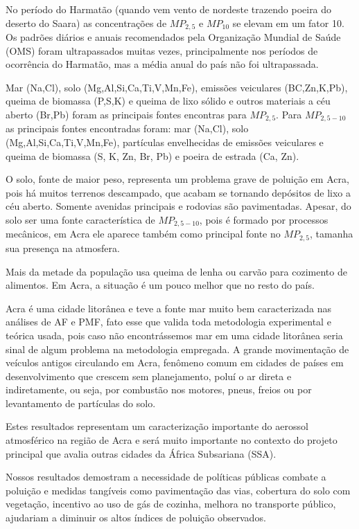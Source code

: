 No período do Harmatão (quando vem vento de nordeste trazendo poeira do deserto do Saara) as concentrações de $MP_{2,5}$ e $MP_{10}$ se elevam em um fator 10. Os padrões diários e anuais recomendados pela Organização Mundial de Saúde (OMS) foram ultrapassados muitas vezes, principalmente nos períodos de ocorrência do Harmatão, mas a média anual do país não foi ultrapassada.

Mar (Na,Cl), solo (Mg,Al,Si,Ca,Ti,V,Mn,Fe), emissões veiculares (BC,Zn,K,Pb), queima de biomassa (P,S,K) e queima de lixo sólido e outros materiais a céu aberto (Br,Pb) foram as principais fontes encontras para $MP_{2,5}$. Para $MP_{2,5-10}$ as principais fontes encontradas foram: mar (Na,Cl), solo (Mg,Al,Si,Ca,Ti,V,Mn,Fe), partículas envelhecidas de emissões veiculares e queima de biomassa (S, K, Zn, Br, Pb) e poeira de estrada (Ca, Zn).

O solo, fonte de maior peso, representa um problema grave de poluição em Acra, pois há muitos terrenos descampado, que acabam se tornando depósitos de lixo a céu aberto. Somente avenidas principais e rodovias são pavimentadas. Apesar, do solo ser uma fonte característica de $MP_{2,5-10}$, pois é formado por processos mecânicos, em Acra ele aparece também como principal fonte no $MP_{2,5}$, tamanha sua presença na atmosfera.    

Mais da metade da população usa queima de lenha ou carvão para cozimento de alimentos. Em Acra, a situação é um pouco melhor que no resto do país. 

Acra é uma cidade litorânea e teve a fonte mar muito bem caracterizada nas análises de AF e PMF, fato esse que valida toda metodologia experimental e teórica usada, pois caso não encontrássemos mar em uma cidade litorânea seria sinal de algum problema na metodologia empregada. 
A grande movimentação de veículos antigos circulando em Acra, fenômeno comum em cidades de países em desenvolvimento que crescem sem planejamento, poluí o ar direta e indiretamente, ou seja, por combustão nos motores, pneus, freios ou por levantamento de partículas do solo. 

Estes resultados representam um caracterização importante do aerossol atmosférico na região de Acra e será muito importante no contexto do projeto principal que avalia outras cidades da África Subsariana (SSA). 

Nossos resultados demostram a necessidade de políticas públicas combate a poluição e medidas tangíveis como pavimentação das vias, cobertura do solo com vegetação, incentivo ao uso de gás de cozinha, melhora no transporte público, ajudariam a diminuir os altos índices de poluição observados.
